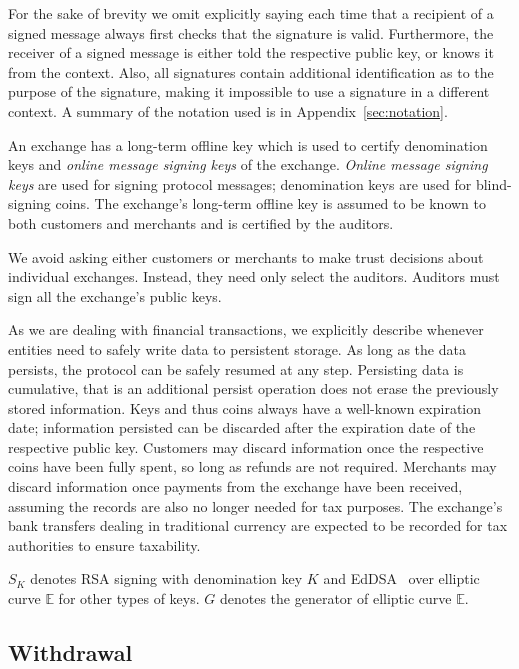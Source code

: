 \documentclass[sigconf, authordraft]{acmart}
\begin{document}
\def\KDF{\textrm{KDF}}
\def\FDH{\textrm{FDH}}


For the sake of brevity we omit explicitly saying each time that a
recipient of a signed message always first checks that the signature
is valid.  Furthermore, the receiver of a signed message is either
told the respective public key, or knows it from the context.  Also,
all signatures contain additional identification as to the purpose of
the signature, making it impossible to use a signature in a different
context.  A summary of the notation used is in Appendix~\ref{sec:notation}.

An exchange has a long-term offline key which is used to certify
denomination keys and {\em online message signing keys} of the
exchange.  {\em Online message signing keys} are used for signing
protocol messages; denomination keys are used for blind-signing coins.
The exchange's long-term offline key is assumed to be known to both
customers and merchants and is certified by the auditors.

We avoid asking either customers or merchants to make trust decisions
about individual exchanges.  Instead, they need only select the auditors.
Auditors must sign all the exchange's public keys.

As we are dealing with financial transactions, we explicitly describe
whenever entities need to safely write data to persistent storage.
As long as the data persists, the protocol can be safely
resumed at any step.  Persisting data is cumulative, that is an
additional persist operation does not erase the previously stored
information.  Keys and thus coins always have a well-known expiration
date; information persisted can be discarded after the
expiration date of the respective public key.
Customers may discard information once the respective coins have been
fully spent, so long as refunds are not required.
Merchants may discard information once payments from the exchange have
been received, assuming the records are also no longer needed for tax
purposes.  The exchange's bank transfers dealing in traditional currency
are expected to be recorded for tax authorities to ensure taxability.

$S_K$ denotes RSA signing with denomination key $K$ and EdDSA~\cite{eddsa,rfc8032}
over elliptic curve $\mathbb{E}$ for other types of keys.
$G$ denotes the generator of elliptic curve $\mathbb{E}$.

\subsection{Withdrawal}
\end{document}
